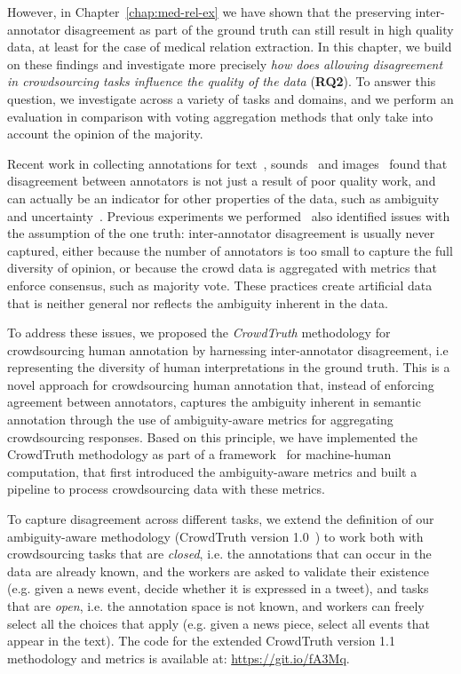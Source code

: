 {\color{blue} However, in Chapter~\ref{chap:med-rel-ex} we have shown that the preserving inter-annotator disagreement as part of the ground truth can still result in high quality data, at least for the case of medical relation extraction. In this chapter, we build on these findings and investigate more precisely \textit{how does allowing disagreement in crowdsourcing tasks influence the quality of the data} (\textbf{RQ2}). To answer this question, we investigate across a variety of tasks and domains, and we perform an evaluation in comparison with voting aggregation methods that only take into account the opinion of the majority.}

Recent work in collecting annotations for text~\cite{poesio2005reliability,chang2016linguistic}, sounds~\cite{doi:10.1080/09298215.2016.1200631} and images~\cite{schaekermann2016,cheplygina2018crowd} found that disagreement between annotators is not just a result of poor quality work, and can actually be an indicator for other properties of the data, such as ambiguity and uncertainty~\cite{aroyo2018aimag}. Previous experiments we performed~\cite{aroyo2013crowd} also identified issues with the assumption of the one truth: inter-annotator disagreement is usually never captured, either because the number of annotators is too small to capture the full diversity of opinion, or because the crowd data is aggregated with metrics that enforce consensus, such as majority vote.  These practices create artificial data that is neither general nor reflects the ambiguity inherent in the data.

To address these issues, we proposed the \textit{CrowdTruth} methodology for crowdsourcing human annotation by harnessing inter-annotator disagreement, i.e representing the diversity of human interpretations in the ground truth. This is a novel approach for crowdsourcing human annotation that, instead of enforcing agreement between annotators, captures the ambiguity inherent in semantic annotation through the use of ambiguity-aware metrics for aggregating crowdsourcing responses. Based on this principle, we have implemented the CrowdTruth methodology as part of a framework~\cite{inel2014crowdtruth} for machine-human computation, that first introduced the ambiguity-aware metrics and built a pipeline to process crowdsourcing data with these metrics.

To capture disagreement across different tasks, we extend the definition of our ambiguity-aware methodology (CrowdTruth version 1.0~\cite{inel2014crowdtruth}) to work both with crowdsourcing tasks that are \textit{closed}, i.e. the annotations that can occur in the data are already known, and the workers are asked to validate their existence (e.g. given a news event, decide whether it is expressed in a tweet), and tasks that are \textit{open}, i.e. the annotation space is not known, and workers can freely select all the choices that apply (e.g. given a news piece, select all events that appear in the text). The code for the extended CrowdTruth version 1.1 methodology and metrics is available at: \url{https://git.io/fA3Mq}.

